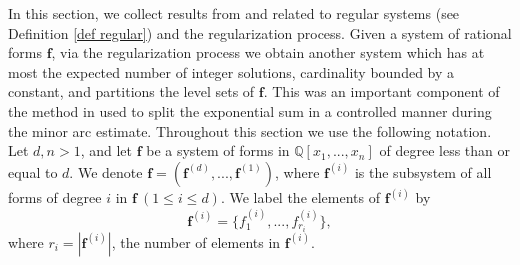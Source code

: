 \documentclass[12pt]{amsart}
\theoremstyle{definition}
\theoremstyle{remark}
\numberwithin{equation}{section}
\begin{document}
In this section, we collect results from \cite{CM} and \cite{S} related to regular systems (see Definition \ref{def regular}) and the
regularization process. Given a system of rational forms $\textbf{f}$, via the regularization process we obtain
another system which has at most the expected number of integer solutions, cardinality bounded by a constant, and partitions the level sets
of $\textbf{f}$. This was an important component of the method in \cite{CM} used to split the
exponential sum in a controlled manner during the minor arc estimate. 
Throughout this section we use the following notation. Let $d, n >1$, and let $\textbf{f}$ be a system of forms in $\mathbb{Q}[x_1, ..., x_n]$ of degree less than or equal to $d$.
We denote $\textbf{f} = ({\textbf{f}}^{(d)}, ..., {\textbf{f}}^{(1)})$, where ${\textbf{f}}^{(i)}$
is the subsystem of all forms of degree $i$ in $\textbf{f} \  (1 \leq i \leq d)$. We label the elements of ${\textbf{f}}^{(i)}$ by
$$
{\mathbf{f}}^{(i)} = \{ f^{(i)}_1, ..., f^{(i)}_{r_i} \},
$$
where $r_i = | {\mathbf{f}}^{(i)} |$, the number of elements in ${\mathbf{f}}^{(i)}$.
\end{document}
